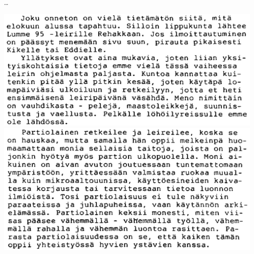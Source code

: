 \clearpage

\vspace*{1.28cm}
\begin{StickyNote}
	\monofont

	{\hspace{0.16cm}\Large\ldots}
	\vspace*{0.16cm}

	\begin{center}
		\includegraphics[width=1\textwidth]{assets/löhöilyseis4}
		\includegraphics[width=1\textwidth]{assets/löhöilyseis5}
	\end{center}




\end{StickyNote}
